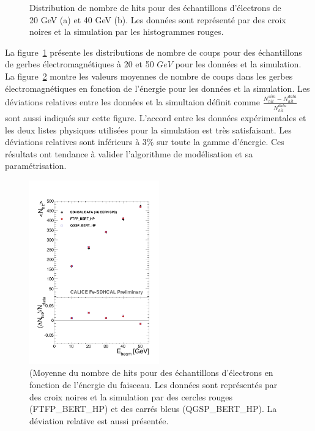 \begin{figure}[!ht]
    \caption{Distribution de nombre de hits pour des échantillons d'électrons de 20 GeV (a) et 40 GeV (b). Les données sont représenté par des croix noires et la simulation par les histogrammes rouges.}
  \label{fig.nhite-_dist}
\end{figure}
La figure~\ref{fig.nhite-_dist} présente les distributions de nombre de coups pour des échantillons de gerbes électromagnétiques à 20 et 50 $GeV$ pour les données et la simulation. La figure~\ref{fig.nhite-} montre les valeurs moyennes de nombre de coups dans les gerbes électromagnétiques en fonction de l'énergie pour les données et la simulation. Les déviations relatives entre les données et la simultaion définit comme $\frac{N_{hit}^{sim}-N_{hit}^{data}}{N_{hit}^{data}}$ sont aussi indiqués sur cette figure. L'accord entre les données expérimentales et les deux listes physiques utilisées pour la simulation est très satisfaisant. Les déviations relatives sont inférieurs à 3\% sur toute la gamme d'énergie. Ces résultats ont tendance à valider l'algorithme de modélisation et sa paramétrisation. 
\begin{figure}[!ht]
  \centering
  \includegraphics[width=0.5\textwidth]{Digitizer/figs/NHITELECTRON.pdf}
  \caption{(Moyenne du nombre de hits pour des échantillons d'électrons en fonction de l’énergie du faisceau. Les données sont représentés par des croix noires et la simulation par des cercles rouges (FTFP\_BERT\_HP) et des carrés bleus (QGSP\_BERT\_HP). La déviation relative est aussi présentée.}
  \label{fig.nhite-}
\end{figure}

